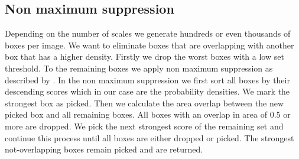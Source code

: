 \subsection{Non maximum suppression}
\label{sec:pipeline:eval:nms}
Depending on the number of scales we generate hundreds or even thousands of boxes per image. We want to eliminate boxes that are overlapping with another box that has a higher density. Firstly we drop the worst boxes with a low set threshold. To the remaining boxes we apply non maximum suppression as described by \citet{felzenszwalb_discriminatively_2008}. In the non maximum suppression we first sort all boxes by their descending scores which in our case are the probability densities. We mark the strongest box as picked. Then we calculate the area overlap between the new picked box and all remaining boxes. All boxes with an overlap in area of 0.5 or more are dropped. We pick the next strongest score of the remaining set and continue this process until all boxes are either dropped or picked. The strongest not-overlapping boxes remain picked and are returned.
